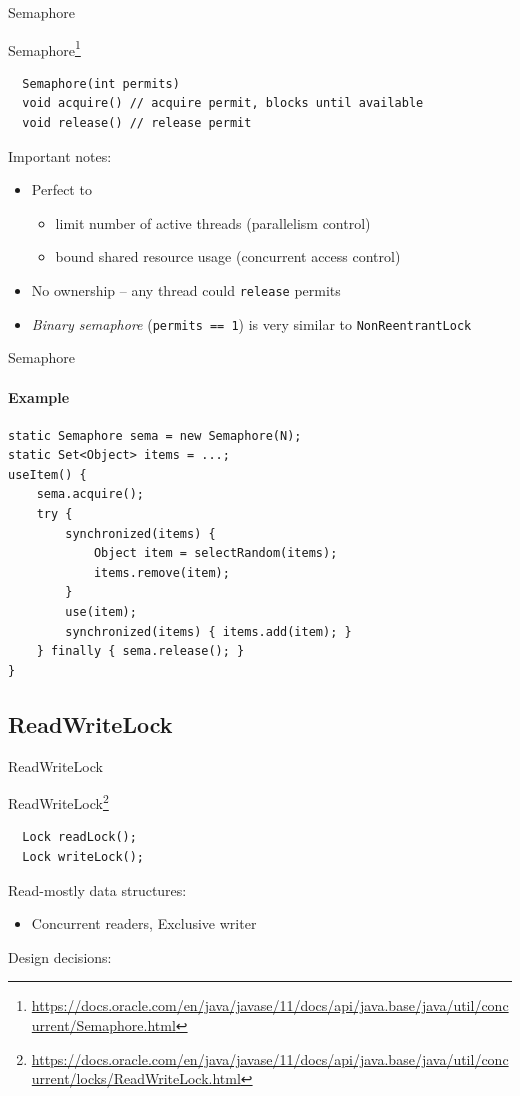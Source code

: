 \begin{frame}[fragile]{Semaphore}

Semaphore\footnote{\tiny\url{https://docs.oracle.com/en/java/javase/11/docs/api/java.base/java/util/concurrent/Semaphore.html}}

\begin{verbatim}
  Semaphore(int permits)
  void acquire() // acquire permit, blocks until available
  void release() // release permit
\end{verbatim}

Important notes:
\begin{itemize}
    \item Perfect to 
    \begin{itemize}
        \item limit number of active threads (parallelism control) 
        \item bound shared resource usage (concurrent access control)
    \end{itemize}    
    \item No ownership -- any thread could \texttt{release} permits
    \item \textit{Binary semaphore} (\texttt{permits == 1}) is very similar to \texttt{NonReentrantLock}
\end{itemize}

\end{frame}

\begin{frame}[fragile]{Semaphore}
\framesubtitle{Example}

\begin{verbatim}
static Semaphore sema = new Semaphore(N);
static Set<Object> items = ...;
useItem() {
    sema.acquire();
    try {
        synchronized(items) {
            Object item = selectRandom(items);
            items.remove(item);
        }
        use(item);
        synchronized(items) { items.add(item); }
    } finally { sema.release(); }
}
\end{verbatim}
\end{frame}

\subsection{ReadWriteLock}
\showTOCSub

\begin{frame}[t,fragile]{ReadWriteLock}

ReadWriteLock\footnote{\tiny\url{https://docs.oracle.com/en/java/javase/11/docs/api/java.base/java/util/concurrent/locks/ReadWriteLock.html}}

\begin{verbatim}
  Lock readLock();
  Lock writeLock();
\end{verbatim}

Read-mostly data structures:
\begin{itemize}
    \item Concurrent readers, Exclusive writer
\end{itemize}

Design decisions:
\end{frame}

